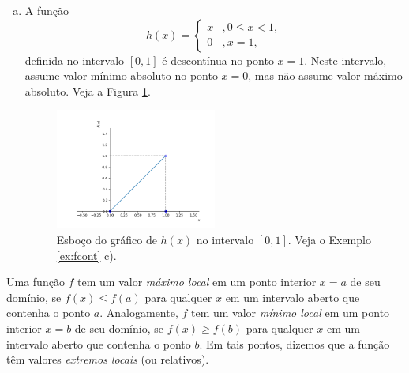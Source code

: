 \begin{ex}
\begin{enumerate}[a)]
\item A função
  \begin{equation}
    h(x) = \left\{
      \begin{array}{ll}
        x &, 0\leq x < 1,\\
        0 &, x=1,
      \end{array}
\right.
\end{equation}
definida no intervalo $[0,1]$ é descontínua no ponto $x=1$. Neste intervalo, assume valor mínimo absoluto no ponto $x=0$, mas não assume valor máximo absoluto. Veja a Figura \ref{fig:ex_fcont_h}.
  \begin{figure}[H]
    \centering
    \includegraphics[width=0.5\textwidth]{./cap_apderiv/dados/fig_ex_fcont/fig_h}
    \caption{Esboço do gráfico de $h(x)$ no intervalo $[0,1]$. Veja o Exemplo \ref{ex:fcont} c).}
    \label{fig:ex_fcont_h}
  \end{figure}
  \end{enumerate}
\end{ex}

Uma função $f$ tem um valor \emph{máximo local} em um ponto interior $x=a$ de seu domínio, se $f(x) \leq f(a)$ para qualquer $x$ em um intervalo aberto que contenha o ponto $a$. Analogamente, $f$ tem um valor \emph{mínimo local} em um ponto interior $x=b$ de seu domínio, se $f(x) \geq f(b)$  para qualquer $x$ em um intervalo aberto que contenha o ponto $b$. Em tais pontos, dizemos que a função têm valores \emph{extremos locais} (ou relativos).

